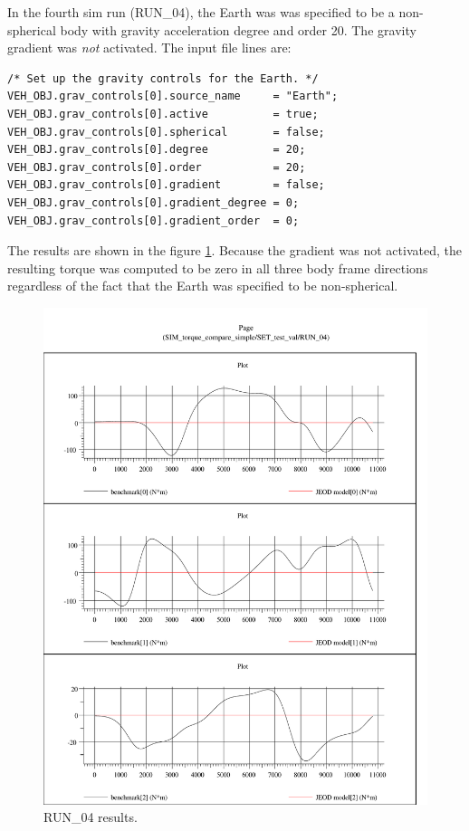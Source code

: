 In the fourth sim run (RUN\_04), the Earth was  was specified to be a
non-spherical body with gravity acceleration degree and order 20.
The gravity gradient was \emph{not} activated. The input file lines
are:
\begin{verbatim}
/* Set up the gravity controls for the Earth. */
VEH_OBJ.grav_controls[0].source_name     = "Earth";
VEH_OBJ.grav_controls[0].active          = true;
VEH_OBJ.grav_controls[0].spherical       = false;
VEH_OBJ.grav_controls[0].degree          = 20;
VEH_OBJ.grav_controls[0].order           = 20;
VEH_OBJ.grav_controls[0].gradient        = false;
VEH_OBJ.grav_controls[0].gradient_degree = 0;
VEH_OBJ.grav_controls[0].gradient_order  = 0;
\end{verbatim}
The results are shown in the figure \ref{fig:run04_results}.
Because the gradient was not activated, the resulting torque
was computed to be zero in all three body frame directions 
regardless of the fact that the Earth was specified to
be non-spherical.
\begin{figure}[h!]
\centering
\includegraphics[width=6.1in]{figs/run_04.pdf}
\caption{RUN\_04 results.}
\label{fig:run04_results}
\end{figure}
\newpage


